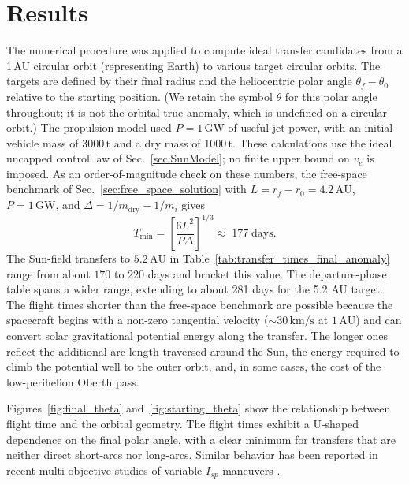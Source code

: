 \documentclass[journal,a4paper]{IEEEtran}
\newcommand{\SI}[2]{\ensuremath{#1\,\mathrm{#2}}}
\begin{document}
\section{Results}
The numerical procedure was applied to compute ideal transfer candidates from a 1\,AU circular orbit (representing Earth) to various target circular orbits. The targets are defined by their final radius and the heliocentric polar angle $\theta_f-\theta_0$ relative to the starting position. (We retain the symbol $\theta$ for this polar angle throughout; it is not the orbital true anomaly, which is undefined on a circular orbit.) The propulsion model used \(P=\SI{1}{GW}\) of useful jet power, with an initial vehicle mass of \SI{3000}{t} and a dry mass of \SI{1000}{t}. These calculations use the ideal uncapped control law of Sec.~\ref{sec:SunModel}; no finite upper bound on \(v_e\) is imposed.
As an order-of-magnitude check on these numbers, the free-space benchmark of Sec.~\ref{sec:free_space_solution} with \(L=r_f-r_0=4.2\,\mathrm{AU}\), \(P=\SI{1}{GW}\), and \(\Delta=1/m_\mathrm{dry}-1/m_i\) gives
\begin{equation*}
T_{\min}
=\!\left[\frac{6L^{2}}{P\Delta}\right]^{1/3}
\!\approx\;177\;\mathrm{days}.
\end{equation*}
The Sun-field transfers to \(5.2\,\mathrm{AU}\) in Table~\ref{tab:transfer_times_final_anomaly} range from about \(170\) to \(220\) days and bracket this value. The departure-phase table spans a wider range, extending to about 281 days for the 5.2 AU target. The flight times shorter than the free-space benchmark are possible because the spacecraft begins with a non-zero tangential velocity (\(\sim\SI{30}{km/s}\) at \(1\,\mathrm{AU}\)) and can convert solar gravitational potential energy along the transfer. The longer ones reflect the additional arc length traversed around the Sun, the energy required to climb the potential well to the outer orbit, and, in some cases, the cost of the low-perihelion Oberth pass.

Figures~\ref{fig:final_theta} and~\ref{fig:starting_theta} show the relationship between flight time and the orbital geometry. The flight times exhibit a U-shaped dependence on the final polar angle, with a clear minimum for transfers that are neither direct short-arcs nor long-arcs. Similar behavior has been reported in recent multi-objective studies of variable-$I_{\!sp}$ maneuvers \cite{DiPasquale2024}.
\end{document}

